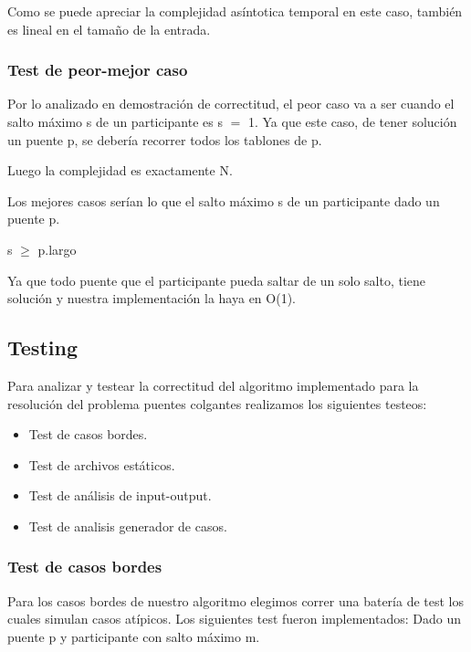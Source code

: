 Como se puede apreciar la complejidad as\'intotica temporal en este caso, tambi\'en es lineal en el tamaño de la entrada.


\subsubsection{Test de peor-mejor caso}

Por lo analizado en demostraci\'on de correctitud, el peor caso va a ser cuando el salto m\'aximo s de un participante es s $=$ 1. Ya que este caso, de tener soluci\'on un puente p, se deber\'ia recorrer todos los tablones de p.

Luego la complejidad es exactamente N.

Los mejores casos ser\'ian lo que el salto m\'aximo s de un participante dado un puente p.

s $\geq$ p.largo

Ya que todo puente que el participante pueda saltar de un solo salto, tiene soluci\'on y nuestra implementaci\'on la haya en O(1).

\newpage

 
\subsection{Testing}

Para analizar y testear la correctitud del algoritmo implementado para la resoluci\'on del problema puentes colgantes realizamos los siguientes testeos:

\begin{itemize}
  \item Test de casos bordes.
  \item Test de archivos est\'aticos.
  \item Test de an\'alisis de input-output.
  \item Test de analisis generador de casos.
\end{itemize}

\subsubsection{Test de casos bordes}

Para los casos bordes de nuestro algoritmo elegimos correr una bater\'ia de test los cuales simulan casos at\'ipicos.
Los siguientes test fueron implementados:
Dado un puente p y participante con salto m\'aximo m.

